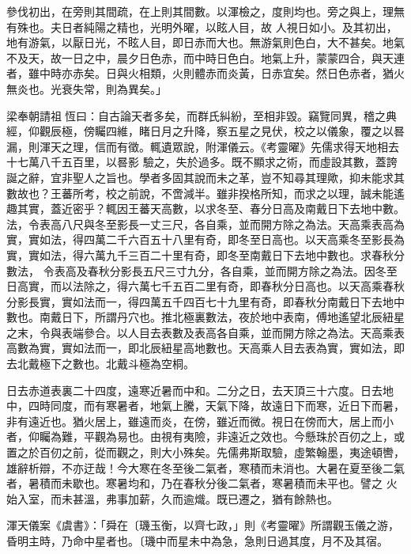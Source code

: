 \begin{pinyinscope}
 參伐初出，在旁則其間疏，在上則其間數。以渾檢之，度則均也。旁之與上，理無有殊也。夫日者純陽之精也，光明外曜，以眩人目，故
 人視日如小。及其初出，地有游氣，以厭日光，不眩人目，即日赤而大也。無游氣則色白，大不甚矣。地氣不及天，故一日之中，晨夕日色赤，而中時日色白。地氣上升，蒙蒙四合，與天連者，雖中時亦赤矣。日與火相類，火則體赤而炎黃，日赤宜矣。然日色赤者，猶火無炎也。光衰失常，則為異矣。」



 梁奉朝請祖恆曰：自古論天者多矣，而群氏糾紛，至相非毀。竊覽同異，稽之典經，仰觀辰極，傍矚四維，睹日月之升降，察五星之見伏，校之以儀象，覆之以晷漏，則渾天之理，信而有徵。輒遺眾說，附渾儀云。《考靈曜》先儒求得天地相去十七萬八千五百里，以晷影
 驗之，失於過多。既不顯求之術，而虛設其數，蓋誇誕之辭，宜非聖人之旨也。學者多固其說而未之革，豈不知尋其理歟，抑未能求其數故也？王蕃所考，校之前說，不啻減半。雖非揆格所知，而求之以理，誠未能遙趣其實，蓋近密乎？輒因王蕃天高數，以求冬至、春分日高及南戴日下去地中數。法，令表高八尺與冬至影長一丈三尺，各自乘，並而開方除之為法。天高乘表高為實，實如法，得四萬二千六百五十八里有奇，即冬至日高也。以天高乘冬至影長為實，實如法，得六萬九千三百二十里有奇，即冬至南戴日下去地中數也。求春秋分數法，
 令表高及春秋分影長五尺三寸九分，各自乘，並而開方除之為法。因冬至日高實，而以法除之，得六萬七千五百二里有奇，即春秋分日高也。以天高乘春秋分影長實，實如法而一，得四萬五千四百七十九里有奇，即春秋分南戴日下去地中數也。南戴日下，所謂丹穴也。推北極裏數法，夜於地中表南，傅地遙望北辰紐星之末，令與表端參合。以人目去表數及表高各自乘，並而開方除之為法。天高乘表高數為實，實如法而一，即北辰紐星高地數也。天高乘人目去表為實，實如法，即去北戴極下之數也。北戴斗極為空桐。



 日去赤道表裏二十四度，遠寒近暑而中和。二分之日，去天頂三十六度。日去地中，四時同度，而有寒暑者，地氣上騰，天氣下降，故遠日下而寒，近日下而暑，非有遠近也。猶火居上，雖遠而炎，在傍，雖近而微。視日在傍而大，居上而小者，仰矚為難，平觀為易也。由視有夷險，非遠近之效也。今懸珠於百仞之上，或置之於百仞之前，從而觀之，則大小殊矣。先儒弗斯取驗，虛繁翰墨，夷途頓轡，雄辭析辯，不亦迂哉！今大寒在冬至後二氣者，寒積而未消也。大暑在夏至後二氣者，暑積而未歇也。寒暑均和，乃在春秋分後二氣者，寒暑積而未平也。譬之
 火始入室，而未甚溫，弗事加薪，久而逾熾。既已遷之，猶有餘熱也。



 渾天儀案《虞書》：「舜在〔璣玉衡，以齊七政，」則《考靈曜》所謂觀玉儀之游，昏明主時，乃命中星者也。〔璣中而星未中為急，急則日過其度，月不及其宿。




\end{pinyinscope}
